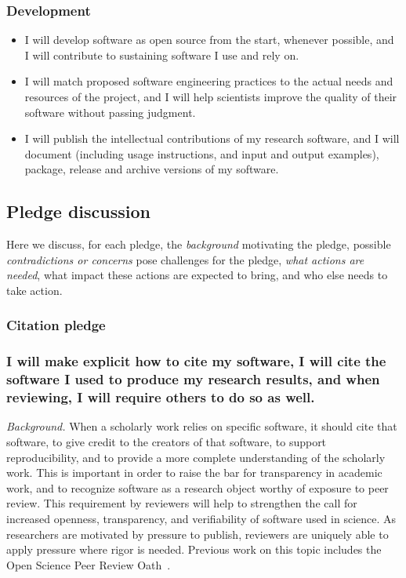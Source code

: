 \documentclass[a4paper,UKenglish]{dagman}
\renewcommand{\paragraph}[1]{\subsubsection*{#1}\xspace}
\begin{document}
\paragraph{Development}
\begin{itemize}
\item I will develop software as open source from the start, whenever possible, and I will contribute to sustaining software I use and rely on.
\item I will match proposed software engineering practices to the actual needs and resources of the project, and I will help scientists improve the quality of their software without passing judgment.
\item I will publish the intellectual contributions of my research software, and I will document (including usage instructions, and input and output examples), package, release and archive versions of my software.
\end{itemize}

\subsection{Pledge discussion}

Here we discuss, for each pledge, the \emph{background} motivating the pledge, possible \emph{contradictions or concerns} pose challenges for the pledge, \emph{what actions are needed}, what impact these actions are expected to bring, and who else needs to take action.



\subsubsection*{Citation pledge}

\paragraph{I will make explicit how to cite my software, I will cite the software I used to produce my research results, and when reviewing, I will require others to do so as well.}

\emph{Background.} When a scholarly work relies on specific software, it should cite that software, to give credit to the creators of that software, to support reproducibility, and to provide a more complete understanding of the scholarly work.
This is important in order to raise the bar for transparency in academic work, and to recognize software as a research object worthy of exposure to peer review. This requirement by reviewers will help to strengthen the call for increased openness, transparency, and verifiability of software used in science. As researchers are motivated by pressure to publish, reviewers are uniquely able to apply pressure where rigor is needed. Previous work on this topic includes the Open Science Peer Review Oath~\cite{aleksic_open_2015}.
\end{document}
